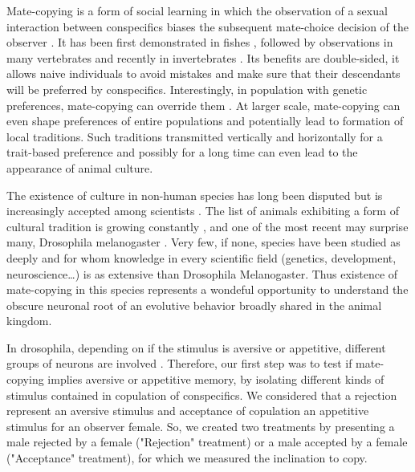 \documentclass[a4paper, 12pt]{article}
\begin{document}
	
	Mate-copying is a form of social learning in which the observation of a sexual interaction between conspecifics biases the subsequent mate-choice decision of the observer \parencite{brown_fish_2011}.
	It has been first demonstrated in fishes \parencite{dugatkin_lee_alan_reversal_1992}, followed by observations in many vertebrates \parencite{galef_mate-choice_1998, yorzinski_same-sex_2010} and recently in invertebrates \parencite{mery_public_2009, fowler-finn_complexities_2015}.
	Its benefits are  double-sided, it allows naive individuals to avoid mistakes and make sure that their descendants will be preferred by conspecifics. 
	Interestingly, in population with genetic preferences, mate-copying can override them \parencite{dugatkin_interface_1996, witte_male_1998}.
	At larger  scale, mate-copying can even shape preferences of entire populations and potentially lead to formation of local traditions.
	Such traditions transmitted vertically and horizontally for a trait-based preference and possibly for a long time can even lead to the appearance of  animal culture\parencite{brooks_importance_1998, danchin_cultural_2018}.
	
	The existence of culture in non-human species has long been disputed \parencite{laland_animals_2003} but is increasingly accepted among scientists \parencite{aplin_experimentally_2015, whitehead_geneculture_2017}. 
	The list of animals exhibiting a form of cultural tradition is growing constantly \parencite{van_schaik_orangutan_2003, thornton_alex_multi-generational_2010, whiten_culture_2017} , and one of the most recent may surprise many, Drosophila melanogaster \parencite{danchin_cultural_2018}. 
	Very few, if none, species have been studied as deeply and for whom knowledge in every scientific field (genetics, development, neuroscience…) is as extensive than Drosophila Melanogaster. 
	Thus existence of mate-copying in this species represents a wondeful opportunity to understand the obscure neuronal root of an evolutive behavior broadly shared in the animal kingdom.
	
	In drosophila, depending on if the stimulus is aversive or appetitive, different groups of neurons are involved \parencite{vogt_shared_2014,busto_olfactory_2010}. 
	Therefore, our first step was to test if mate-copying implies aversive or appetitive memory, by isolating different kinds of stimulus contained in copulation of conspecifics. 
	We considered that a rejection represent an aversive stimulus and acceptance of copulation an appetitive stimulus for an observer female. 
	So, we created two treatments by presenting a male rejected by a female ("Rejection" treatment) or a male accepted by a female ("Acceptance" treatment), for which we measured the inclination to copy. 
	
\end{document}
